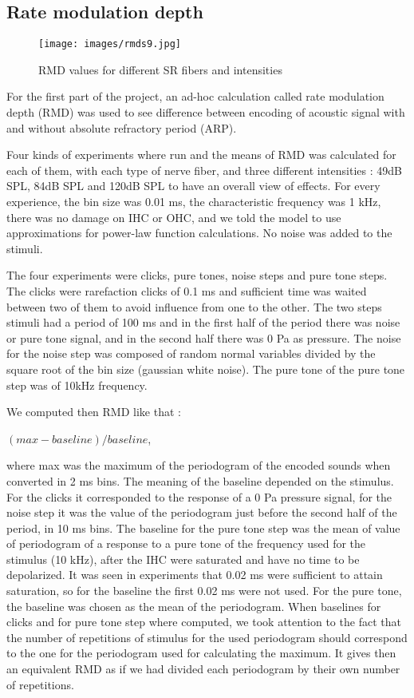 
\subsection{Rate modulation depth}

\begin{figure*}[ht]
	\centering
  \texttt{[image: images/rmds9.jpg]}
	\caption{RMD values for different SR fibers and intensities}
	\label{fig:rmds}
\end{figure*}

For the first part of the project, an ad-hoc calculation called rate 
modulation depth (RMD) was used to see difference between encoding 
of acoustic signal with and without absolute refractory period (ARP).

Four kinds of experiments where run and the means of RMD was calculated 
for each of them, 
with each type of nerve fiber, and three different intensities : 
49dB SPL, 84dB SPL and 120dB SPL to have an overall view of effects. 
For every experience, the bin size was 0.01 ms, the characteristic frequency was 1 kHz, 
there was no damage on IHC or OHC, and we told the model to use approximations 
for power-law function calculations. No noise was added to the stimuli.

The four experiments were clicks, pure tones, noise steps and pure tone steps.
The clicks were rarefaction clicks of 0.1 ms and sufficient time was waited between 
two of them to avoid influence from one to the other.
The two steps stimuli had a period of 100 ms and in the first half of the period 
there was noise or pure tone signal, and in the second half there was 0 Pa as pressure.
The noise for the noise step was composed of random normal variables divided 
by the square root of the bin size (gaussian white noise).
The pure tone of the pure tone step was of 10kHz frequency.

We computed then RMD like that : 

$(max - baseline) / baseline$,

where max was 
the maximum of the periodogram of the encoded sounds when converted in 2 ms bins.
The meaning of the baseline depended on the stimulus. 
For the clicks it corresponded to the response of a 0 Pa pressure signal, 
for the noise step it was the value of the periodogram just before the second 
half of the period, in 10 ms bins. 
The baseline for the pure tone step was the mean of value of periodogram 
of a response to a pure tone of the frequency used for the stimulus (10 kHz),
after the IHC were saturated and have no time to be depolarized. 
It was seen in experiments that 0.02 ms were sufficient to attain saturation,
so for the baseline the first 0.02 ms were not used.
For the pure tone, the baseline was chosen as the mean of the periodogram.
When baselines for clicks and for pure tone step where computed, 
we took attention to the fact that the number of repetitions of stimulus
for the used periodogram should correspond to the one for the periodogram used for 
calculating the maximum. 
It gives then an equivalent RMD as if we had divided each periodogram by 
their own number of repetitions.

